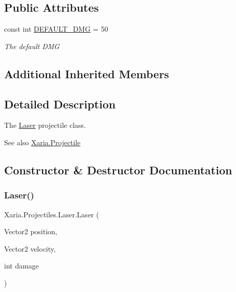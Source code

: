 \subsection*{Public Attributes}
\begin{DoxyCompactItemize}
\item 
const int \hyperlink{classXaria_1_1Projectiles_1_1Laser_a0feea1dcc01170ad2871e16ab7935d60}{D\+E\+F\+A\+U\+L\+T\+\_\+\+D\+MG} = 50
\begin{DoxyCompactList}\small\item\em The default D\+MG \end{DoxyCompactList}\end{DoxyCompactItemize}
\subsection*{Additional Inherited Members}


\subsection{Detailed Description}
The \hyperlink{classXaria_1_1Projectiles_1_1Laser}{Laser} projectile class. 

\begin{DoxySeeAlso}{See also}
\hyperlink{classXaria_1_1Projectile}{Xaria.\+Projectile}


\end{DoxySeeAlso}


\subsection{Constructor \& Destructor Documentation}
\mbox{\label{classXaria_1_1Projectiles_1_1Laser_a9ee8ad23d0355112d7470b2dbadb6f05}} 
\subsubsection{\texorpdfstring{Laser()}{Laser()}}
{\footnotesize\ttfamily Xaria.\+Projectiles.\+Laser.\+Laser (\begin{DoxyParamCaption}\item[{Vector2}]{position,  }\item[{Vector2}]{velocity,  }\item[{int}]{damage }\end{DoxyParamCaption})\hspace{0.3cm}{\ttfamily [inline]}}



